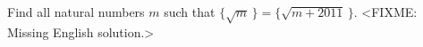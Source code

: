 \problem
Find all natural numbers $m$ such that
\(
    \bigl\{ \sqrt{m} \, \bigr\}
=
    \bigl\{ \sqrt{m+2011} \, \bigr\}
\).
\solution
<FIXME: Missing English solution.>
\endproblem
